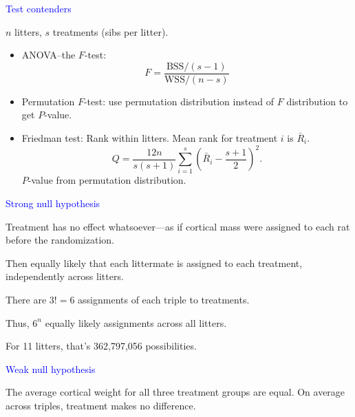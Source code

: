 \documentclass[landscape]{slides}
\begin{document}
\begin {slide}
{\textcolor{blue}{\sc Test contenders}}

$n$ litters, $s$ treatments (sibs per litter).
\begin{itemize}
	\item ANOVA--the $F$-test:
              $$ 
              F = \frac{\mbox{BSS}/(s-1)}{\mbox{WSS}/(n-s)}
              $$
	\item Permutation $F$-test: use permutation 
	      distribution instead of $F$ distribution to get $P$-value.
	\item Friedman test: Rank within litters. Mean rank for treatment $i$
	      is $\bar{R}_i$.
	      $$ 
	      Q = \frac{12n}{s(s+1)} \sum_{i=1}^s \left ( \bar{R}_i - \frac{s+1}{2} \right )^2.
	      $$
	      $P$-value from permutation distribution. 
\end{itemize}

\end{slide}


\begin {slide}
{\textcolor{blue}{\sc Strong null hypothesis}}

{\textcolor{one}{Treatment has no effect whatsoever---as if cortical mass were 
assigned to each rat before the randomization.}}

Then equally likely that each littermate is assigned to each treatment, 
independently across litters.

There are $3! = 6$ assignments of each triple to treatments.

Thus, {\textcolor{one}{$6^n$ equally likely assignments across all litters.}}

For 11 litters, that's 362,797,056 possibilities.


\end{slide}

\begin {slide}


{\textcolor{blue}{\sc Weak null hypothesis}}

{\textcolor{one}{The average cortical weight for all three treatment groups are equal.
On average across triples, treatment makes no difference.}}


\end {slide}
\end{document}
